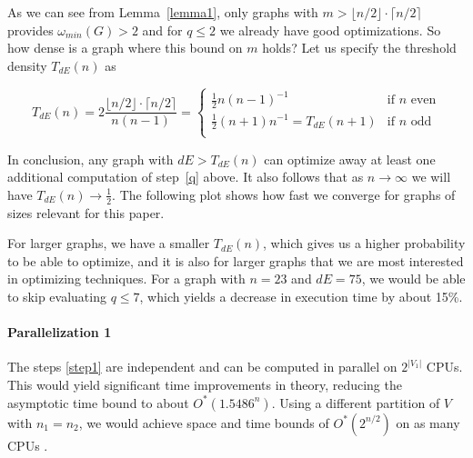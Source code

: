 \documentclass{cslthse-msc}
\begin{document}
As we can see from Lemma~\ref{lemma1}, only graphs with $m > \lfloor n / 2 \rfloor \cdot \lceil n / 2 \rceil$ provides $\omega_{min}(G) > 2$ and for $q \leq 2$ we already have good optimizations. So how dense is a graph where this bound on $m$ holds? Let us specify the threshold density $T_{dE}(n)$ as

\[
T_{dE}(n) = 2\frac{\lfloor n / 2 \rfloor \cdot \lceil n / 2 \rceil}{n(n-1)} =
\begin{cases}
	  \frac{1}{2}n(n-1)^{-1} & \text{if } n \text{ even}\\
	  \frac{1}{2}(n+1)n^{-1} = T_{dE}(n+1) & \text{if } n \text{ odd}\\
\end{cases}
\]

In conclusion, any graph with $dE > T_{dE}(n)$ can optimize away at least one additional computation of step~\ref{q} above. It also follows that as $n \rightarrow \infty$ we will have $T_{dE}(n) \rightarrow \frac{1}{2}$. The following plot shows how fast we converge for graphs of sizes relevant for this paper.

\begin{center}
\end{center}
For larger graphs, we have a smaller $T_{dE}(n)$, which gives us a higher probability to be able to optimize, and it is also for larger graphs that we are most interested in optimizing techniques. For a graph with $n=23$ and $dE = 75$, we would be able to skip evaluating $q\leq7$, which yields a decrease in execution time by about 15\%\footnotemark. %


\paragraph{Parallelization 1}\label{parallelization1} The steps \ref{step1} are independent and can be computed in parallel on $2^{|V_1|}$ CPUs. This would yield significant time improvements in theory, reducing the asymptotic time bound to about $O^*(1.5486^n)$. Using a different partition of $V$ with $n_1 = n_2$, we would achieve space and time bounds of $O^*(2^{n/2})$ on as many CPUs \cite{cov_pack}.
\end{document}
